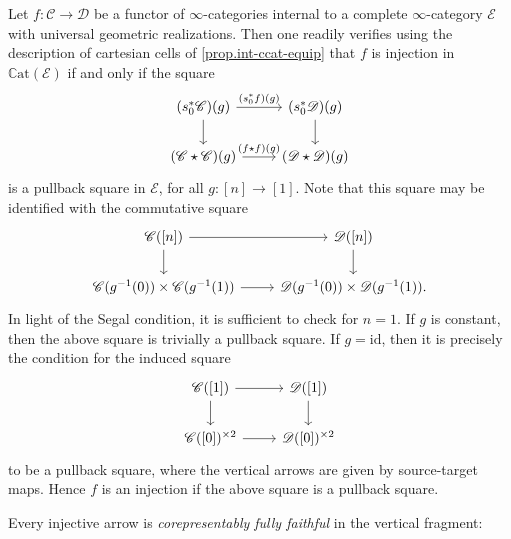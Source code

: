 \documentclass[a4paper, 11pt]{amsart}
\numberwithin{theorem}{section}
\theoremstyle{definition}
\newcommand{\C}{\mathscr{C}}
\renewcommand{\D}{\mathscr{D}}
\newcommand{\E}{\mathscr{E}}
\newcommand{\id}{\mathrm{id}}
\newcommand{\CCAT}{\mathbb{C}\mathrm{at}}
\begin{document}
\begin{example}
	 Let $f : \C \rightarrow \D$ be a functor of $\infty$-categories 
	internal to a complete $\infty$-category $\E$ with universal geometric realizations. Then one readily verifies using the description 
	of cartesian cells of \cref{prop.int-ccat-equip} that $f$ is injection in $\CCAT(\E)$ if and only if the square 
	\[
		\begin{tikzcd}
			(s_0^*\C)(g) \arrow[r, "(s_0^*f)(g)"] \arrow[d] & (s_0^*\D)(g) \arrow[d] \\
			(\C \star \C)(g) \arrow[r, "(f \star f)(g)"] & (\D \star \D)(g)
		\end{tikzcd}
	\]
	is a pullback square in $\E$, for all $g : [n] \rightarrow [1]$. Note that this square may be identified with the commutative square
	$$
	\begin{tikzcd}
		\C([n]) \arrow[r] \arrow[d] & \D([n]) \arrow[d] \\
		\C(g^{-1}(0)) \times \C(g^{-1}(1)) \arrow[r] & \D(g^{-1}(0)) \times \D(g^{-1}(1)). 
	\end{tikzcd}
	$$
	In light of the Segal condition, it is sufficient to check for $n=1$. If $g$ is constant, then the above square is trivially a pullback square. If $g = \id$, then it is precisely 
	the condition for the induced square
	\[
		\begin{tikzcd}
			\C([1]) \arrow[r ] \arrow[d] & \D([1]) \arrow[d] \\
			\C([0])^{\times 2}\arrow[r] & \D([0])^{\times 2}
		\end{tikzcd}
	\]
	to be a pullback square, where the vertical arrows are given by source-target maps. Hence $f$ is an injection if the above square is a pullback square.
\end{example}

Every injective arrow is \textit{corepresentably fully faithful} in the vertical fragment:
\end{document}
